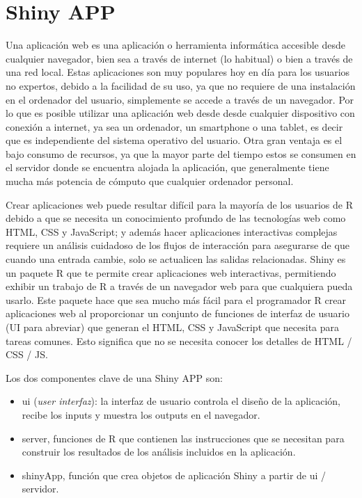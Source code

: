 \section{Shiny APP}
Una aplicación web es una aplicación o herramienta informática accesible desde cualquier navegador, bien sea a través de internet (lo habitual) o bien a través de una red local. 
Estas aplicaciones son muy populares hoy en día para los usuarios no expertos, debido a la facilidad de su uso, ya que no requiere de una instalación en el ordenador del usuario, simplemente se accede a través de un navegador. Por lo que es posible utilizar una aplicación web desde desde cualquier dispositivo con conexión a internet, ya sea un ordenador, un smartphone o una tablet, es decir que es independiente del sistema operativo del usuario. Otra gran ventaja es el bajo consumo de recursos, ya que la mayor parte del tiempo estos se consumen en el servidor donde se encuentra alojada la aplicación, que generalmente tiene mucha más potencia de cómputo que cualquier ordenador personal.

Crear aplicaciones web puede resultar difícil para la mayoría de los usuarios de R debido a que se necesita un conocimiento profundo de las tecnologías web como HTML, CSS y JavaScript; y además hacer aplicaciones interactivas complejas requiere un análisis cuidadoso de los flujos de interacción para asegurarse de que cuando una entrada cambie, solo se actualicen las salidas relacionadas. Shiny es un paquete R que te permite crear aplicaciones web interactivas, permitiendo exhibir un trabajo de R a través de un navegador web para que cualquiera pueda usarlo. Este paquete hace que sea mucho más fácil para el programador R crear aplicaciones web al proporcionar un conjunto de funciones de interfaz de usuario (UI para abreviar) que generan el HTML, CSS y JavaScript que necesita para tareas comunes. Esto significa que no se necesita conocer los detalles de HTML / CSS / JS. 


Los dos componentes clave de una Shiny APP son: 
\begin{itemize}
\item ui (\emph{user interfaz}): la interfaz de usuario controla el diseño de la aplicación, recibe los inputs y
muestra los outputs en el navegador.
\item server, funciones de R que contienen las instrucciones que se necesitan para construir los resultados de los análisis incluidos en la aplicación.
\item shinyApp, función que crea objetos de aplicación Shiny a partir de ui / servidor.
\end{itemize}


